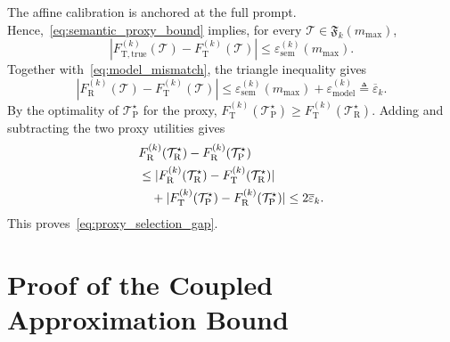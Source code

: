 \documentclass[journal]{IEEEtran}
\begin{document}
The affine calibration is anchored at the full prompt. Hence,~\eqref{eq:semantic_proxy_bound} implies, for every $\mathcal T\in\mathfrak F_k(m_{\max})$,
\begin{equation}
|F_{\mathrm T,\mathrm{true}}^{(k)}(\mathcal T)
-F_{\mathrm T}^{(k)}(\mathcal T)|
\leq\varepsilon_{\mathrm{sem}}^{(k)}(m_{\max}).
\end{equation}
Together with~\eqref{eq:model_mismatch}, the triangle inequality gives
\begin{equation}
|F_{\mathrm R}^{(k)}(\mathcal T)-F_{\mathrm T}^{(k)}(\mathcal T)|
\leq\varepsilon_{\mathrm{sem}}^{(k)}(m_{\max})
+\varepsilon_{\mathrm{model}}^{(k)}
\triangleq\overline\varepsilon_k.
\end{equation}
By the optimality of $\mathcal T_{\mathrm P}^{\star}$ for the proxy,
$F_{\mathrm T}^{(k)}(\mathcal T_{\mathrm P}^{\star})\geq F_{\mathrm T}^{(k)}(\mathcal T_{\mathrm R}^{\star})$. Adding and subtracting the two proxy utilities gives
\begin{align}
&F_{\mathrm R}^{(k)}(\mathcal T_{\mathrm R}^{\star})
-F_{\mathrm R}^{(k)}(\mathcal T_{\mathrm P}^{\star})
\notag\\
&\leq
|F_{\mathrm R}^{(k)}(\mathcal T_{\mathrm R}^{\star})
-F_{\mathrm T}^{(k)}(\mathcal T_{\mathrm R}^{\star})|
\notag\\
&\quad+
|F_{\mathrm T}^{(k)}(\mathcal T_{\mathrm P}^{\star})
-F_{\mathrm R}^{(k)}(\mathcal T_{\mathrm P}^{\star})|
\leq2\overline\varepsilon_k.
\end{align}
This proves~\eqref{eq:proxy_selection_gap}.

\section{Proof of the Coupled Approximation Bound}
\end{document}
